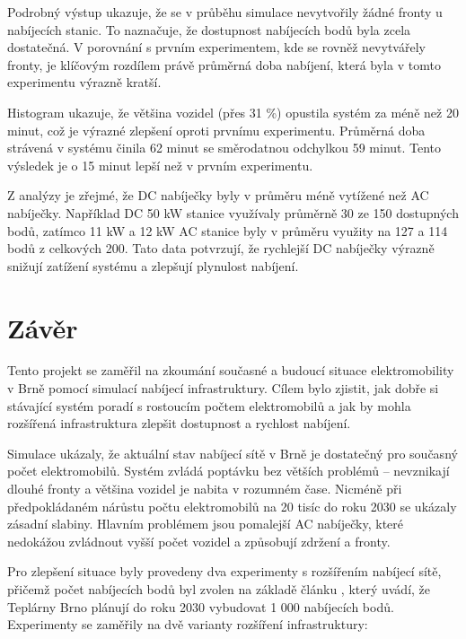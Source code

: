 \documentclass[a4paper,11pt]{article}
\begin{document}
Podrobný výstup ukazuje, že se v průběhu simulace nevytvořily žádné fronty u nabíjecích stanic. To naznačuje, že dostupnost nabíjecích bodů byla zcela dostatečná. V porovnání s prvním experimentem, kde se rovněž nevytvářely fronty, je klíčovým rozdílem právě průměrná doba nabíjení, která byla v tomto experimentu výrazně kratší.

Histogram ukazuje, že většina vozidel (přes 31 \%) opustila systém za méně než 20 minut, což je výrazné zlepšení oproti prvnímu experimentu. Průměrná doba strávená v systému činila 62 minut se směrodatnou odchylkou 59 minut. Tento výsledek je o 15 minut lepší než v prvním experimentu.

Z analýzy je zřejmé, že DC nabíječky byly v průměru méně vytížené než AC nabíječky. Například DC 50 kW stanice využívaly průměrně 30 ze 150 dostupných bodů, zatímco 11 kW a 12 kW AC stanice byly v průměru využity na 127 a 114 bodů z celkových 200. Tato data potvrzují, že rychlejší DC nabíječky výrazně snižují zatížení systému a zlepšují plynulost nabíjení.

\section{Závěr}
Tento projekt se zaměřil na zkoumání současné a budoucí situace elektromobility v Brně pomocí simulací nabíjecí infrastruktury. Cílem bylo zjistit, jak dobře si stávající systém poradí s rostoucím počtem elektromobilů a jak by mohla rozšířená infrastruktura zlepšit dostupnost a rychlost nabíjení.

Simulace ukázaly, že aktuální stav nabíjecí sítě v Brně je dostatečný pro současný počet elektromobilů. Systém zvládá poptávku bez větších problémů -- nevznikají dlouhé fronty a většina vozidel je nabita v rozumném čase. Nicméně při předpokládaném nárůstu počtu elektromobilů na 20 tisíc do roku 2030 se ukázaly zásadní slabiny. Hlavním problémem jsou pomalejší AC nabíječky, které nedokážou zvládnout vyšší počet vozidel a způsobují zdržení a fronty.

Pro zlepšení situace byly provedeny dva experimenty s rozšířením nabíjecí sítě, přičemž počet nabíjecích bodů byl zvolen na základě článku \cite{ev_growth}, který uvádí, že Teplárny Brno plánují do roku 2030 vybudovat 1 000 nabíjecích bodů. Experimenty se zaměřily na dvě varianty rozšíření infrastruktury:
\end{document}
